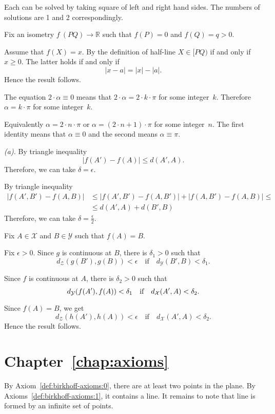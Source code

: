 Each can be solved by taking square of left and right hand sides.
The numbers of solutions are 1 and 2 correspondingly.

Fix an isometry $f\:(P Q)\to \mathbb{R}$ such that $f(P)=0$ and $f(Q)=q>0$.

Assume that $f(X)=x$.
By the definition of half-line $X\in[PQ)$ if and only if $x\ge 0$.
The latter holds if and only if 
\[|x-a|=|x|-|a|.\]
Hence the result follows.


The equation
$2\cdot\alpha\equiv 0$
means that $2\cdot\alpha=2\cdot k\cdot\pi$ for some integer~$k$.
Therefore
$\alpha=k\cdot\pi$ for some integer~$k$.

Equivalently $\alpha=2\cdot n\cdot \pi$ or $\alpha=(2\cdot n+1)\cdot \pi$ for some integer~$n$.
The first identity means that $\alpha\equiv 0$ and the second means $\alpha\equiv \pi$.

 \textit{(a).}
By triangle inequality 
$$|f(A')-f(A)|\le d(A',A).$$
Therefore, we can take $\delta=\epsilon$.

By triangle inequality 
\begin{align*}
|f(A',B')-f(A,B)|
&\le |f(A',B')-f(A,B')|
+|f(A,B')-f(A,B)|
\le
\\
&\le d(A',A)+d(B',B)
\end{align*}
Therefore, we can take $\delta=\tfrac\epsilon2$.

Fix $A\in \mathcal{X}$ and $B\in\mathcal{Y}$
such that $f(A)=B$.

Fix $\epsilon>0$.
Since $g$ is continuous at $B$, there is $\delta_1>0$ such that 
$$d_{\mathcal{Z}}(g(B'),g(B))<\epsilon
\quad
\text{if}
\quad
d_{\mathcal{Y}}(B',B)<\delta_1.$$ 

Since $f$ is continuous at $A$, there is $\delta_2>0$ such that 
$$d_{\mathcal{Y}}(f(A'),f(A))\z<\delta_1
\quad
\text{if}
\quad
d_{\mathcal{X}}(A',A)<\delta_2.$$ 

Since $f(A)=B$, we get
$$d_{\mathcal{Z}}(h(A'),h(A))<\epsilon
\quad
\text{if}
\quad
d_{\mathcal{X}}(A',A)<\delta_2.$$ 
Hence the result follows.


\section*{Chapter~\ref{chap:axioms}}
\setcounter{eqtn}{0}

 By Axiom~\ref{def:birkhoff-axioms:0}, there are at least two points in the plane.
By Axioms~\ref{def:birkhoff-axioms:1}, 
it contains a line. 
It remains to note that line is formed by an infinite set of points.

